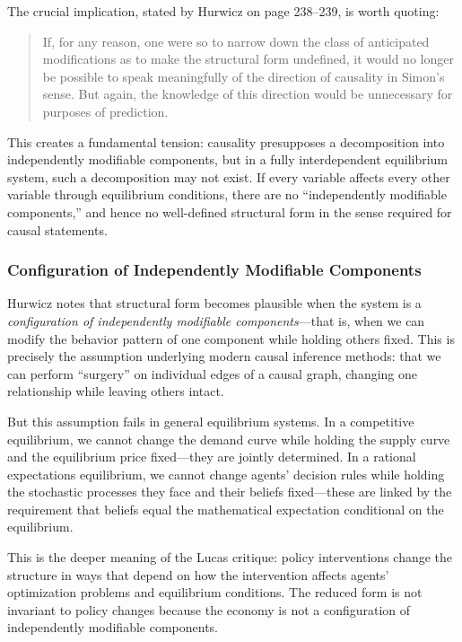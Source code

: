 \documentclass[12pt]{article}
\begin{document}
The crucial implication, stated by Hurwicz on page 238--239, is worth quoting:

\begin{quote}
If, for any reason, one were so to narrow down the class of anticipated modifications as to make the structural form undefined, it would no longer be possible to speak meaningfully of the direction of causality in Simon's sense. But again, the knowledge of this direction would be unnecessary for purposes of prediction.
\end{quote}

This creates a fundamental tension: causality presupposes a decomposition into independently modifiable components, but in a fully interdependent equilibrium system, such a decomposition may not exist. If every variable affects every other variable through equilibrium conditions, there are no ``independently modifiable components,'' and hence no well-defined structural form in the sense required for causal statements.

\subsubsection{Configuration of Independently Modifiable Components}

Hurwicz notes that structural form becomes plausible when the system is a \emph{configuration of independently modifiable components}---that is, when we can modify the behavior pattern of one component while holding others fixed. This is precisely the assumption underlying modern causal inference methods: that we can perform ``surgery'' on individual edges of a causal graph, changing one relationship while leaving others intact.

But this assumption fails in general equilibrium systems. In a competitive equilibrium, we cannot change the demand curve while holding the supply curve and the equilibrium price fixed---they are jointly determined. In a rational expectations equilibrium, we cannot change agents' decision rules while holding the stochastic processes they face and their beliefs fixed---these are linked by the requirement that beliefs equal the mathematical expectation conditional on the equilibrium.

This is the deeper meaning of the Lucas critique: policy interventions change the structure in ways that depend on how the intervention affects agents' optimization problems and equilibrium conditions. The reduced form is not invariant to policy changes because the economy is not a configuration of independently modifiable components.
\end{document}
